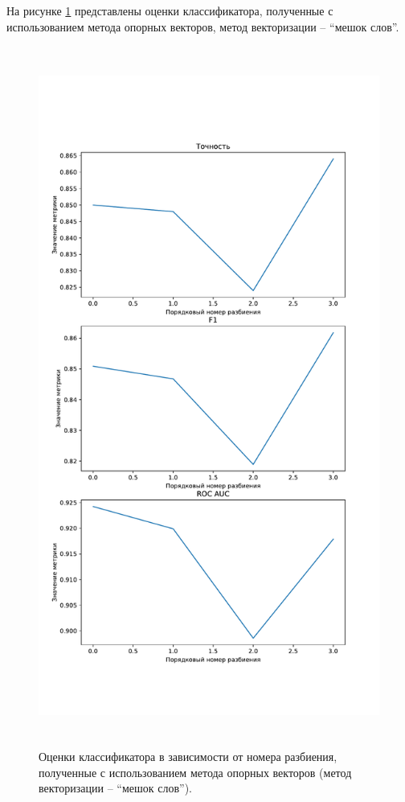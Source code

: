 На рисунке \ref{img:svcMetricsBag} представлены оценки классификатора, полученные с использованием метода опорных векторов, метод векторизации -- ``мешок слов''.
\begin{figure}[H]
	\centering
	\includegraphics[height=23cm]{inc/plots/svcMetricsBag.pdf}
	\caption{ Оценки классификатора в зависимости от номера разбиения, полученные с использованием метода опорных векторов (метод векторизации --  ``мешок слов''). }
	\label{img:svcMetricsBag}
\end{figure}


